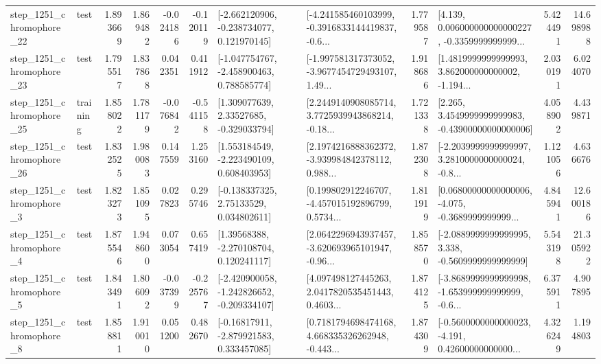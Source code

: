 \begin{tabular}{llrrrrllrlrr}
 step\_1251\_chromophore\_22 &      test &      1.893669 &    1.869482 &     -0.024186 & -0.120119 &   [-2.662120906, -0.238734077, 0.121970145] &  [-4.241585460103999, -0.3916833144419837, -0.6... &       1.779587 &  [4.139, 0.006000000000000227, -0.3359999999999... &            5.424491 &         14.698988 \\
 step\_1251\_chromophore\_23 &      test &      1.795517 &    1.837868 &      0.042351 &  0.411912 &   [-1.047754767, -2.458900463, 0.788585774] &  [-1.997581317373052, -3.9677454729493107, 1.49... &       1.918686 &  [1.4819999999999993, 3.862000000000002, -1.194... &            2.030191 &          6.024070 \\
 step\_1251\_chromophore\_25 &  training &      1.858022 &    1.781179 &     -0.076842 & -0.541158 &     [1.309077639, 2.33527685, -0.329033794] &  [2.2449140908085714, 3.7725939943868214, -0.18... &       1.721338 &  [2.265, 3.4549999999999983, -0.43900000000000006] &            4.058902 &          4.439871 \\
 step\_1251\_chromophore\_26 &      test &      1.832525 &    1.980083 &      0.147559 &  1.253160 &    [1.553184549, -2.223490109, 0.608403953] &  [2.1974216888362372, -3.939984842378112, 0.988... &       1.872308 &  [-2.2039999999999997, 3.2810000000000024, -0.8... &            1.121056 &          4.636676 \\
  step\_1251\_chromophore\_3 &      test &      1.823273 &    1.851095 &      0.027823 &  0.295746 &     [-0.138337325, 2.75133529, 0.034802611] &  [0.199802912246707, -4.457015192896799, 0.5734... &       1.811919 &  [0.06800000000000006, -4.075, -0.3689999999999... &            4.845941 &         12.600186 \\
  step\_1251\_chromophore\_4 &      test &      1.875546 &    1.948600 &      0.073054 &  0.657419 &     [1.39568388, -2.270108704, 0.120241117] &  [2.0642296943937457, -3.620693965101947, -0.96... &       1.858570 &  [-2.0889999999999995, 3.338, -0.5609999999999999] &            5.543198 &         21.305922 \\
  step\_1251\_chromophore\_5 &      test &      1.843491 &    1.806092 &     -0.037399 & -0.225767 &  [-2.420900058, -1.242826652, -0.209334107] &  [4.097498127445263, 2.0417820535451443, 0.4603... &       1.874125 &  [-3.8689999999999998, -1.653999999999999, -0.6... &            6.375911 &          4.907895 \\
  step\_1251\_chromophore\_8 &      test &      1.858811 &    1.910010 &      0.051200 &  0.482670 &    [-0.16817911, -2.879921583, 0.333457085] &  [0.7181794698474168, 4.668335326262948, -0.443... &       1.874309 &  [-0.5600000000000023, -4.191, 0.42600000000000... &            4.326249 &          1.194803 \\

\end{tabular}
